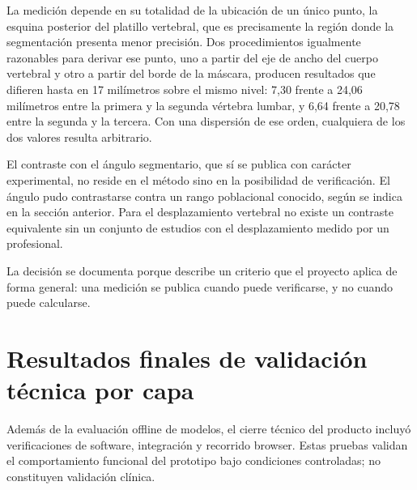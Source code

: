 La medición depende en su totalidad de la ubicación de un único punto, la esquina posterior del platillo vertebral, que es precisamente la región donde la segmentación presenta menor precisión. Dos procedimientos igualmente razonables para derivar ese punto, uno a partir del eje de ancho del cuerpo vertebral y otro a partir del borde de la máscara, producen resultados que difieren hasta en 17 milímetros sobre el mismo nivel: 7,30 frente a 24,06 milímetros entre la primera y la segunda vértebra lumbar, y 6,64 frente a 20,78 entre la segunda y la tercera. Con una dispersión de ese orden, cualquiera de los dos valores resulta arbitrario.

El contraste con el ángulo segmentario, que sí se publica con carácter experimental, no reside en el método sino en la posibilidad de verificación. El ángulo pudo contrastarse contra un rango poblacional conocido, según se indica en la sección anterior. Para el desplazamiento vertebral no existe un contraste equivalente sin un conjunto de estudios con el desplazamiento medido por un profesional.

La decisión se documenta porque describe un criterio que el proyecto aplica de forma general: una medición se publica cuando puede verificarse, y no cuando puede calcularse.


\section{Resultados finales de validación técnica por capa}
\label{sec:resultados-validacion-final}
Además de la evaluación offline de modelos, el cierre técnico del producto incluyó verificaciones de software, integración y recorrido browser. Estas pruebas validan el comportamiento funcional del prototipo bajo condiciones controladas; no constituyen validación clínica.

